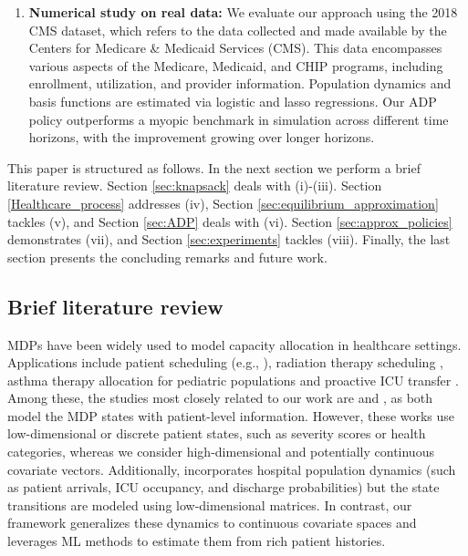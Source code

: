 \documentclass[12pt,a4paper]{article}
\begin{document}
\begin{enumerate}
        \item[(viii)]{ {\bf Numerical study on real data:} We evaluate our approach using the 2018 CMS dataset, which refers to the data collected and made available by the Centers for Medicare \& Medicaid Services (CMS). This data encompasses various aspects of the Medicare, Medicaid, and CHIP programs, including enrollment, utilization, and provider information. Population dynamics and basis functions are estimated via logistic and lasso regressions. Our ADP policy outperforms a myopic benchmark in simulation across different time horizons, with the improvement growing over longer horizons.}
	\end{enumerate}
	

	

	This paper is structured as follows. In the next section we perform a brief literature review. Section \ref{sec:knapsack} deals with (i)-(iii). Section \ref{Healthcare_process} addresses (iv), Section \ref{sec:equilibrium_approximation} tackles (v),  and Section \ref{sec:ADP} deals with (vi). Section \ref{sec:approx_policies} demonstrates (vii), and
    Section \ref{sec:experiments} tackles (viii). Finally, the last section presents the concluding remarks and future work. %

	\color{black}
	
	
	\subsection{Brief literature review}


    MDPs have been widely used to model capacity allocation in healthcare settings. Applications include patient scheduling (e.g., \cite{diamant, astaraky, saure2020}), radiation therapy scheduling \citep{saure2021},  asthma therapy allocation for pediatric populations \citep{deo} and proactive ICU transfer \citep{grandclement}. Among these, the studies most closely related to our work are \cite{deo} and \cite{grandclement}, as both model the MDP states with patient-level information. However, these works use low-dimensional or discrete patient states, such as severity scores or health categories, whereas we consider high-dimensional and potentially continuous covariate vectors. Additionally, \cite{grandclement} incorporates hospital population dynamics (such as patient arrivals, ICU occupancy, and discharge probabilities) but the state transitions are modeled using low-dimensional matrices. In contrast, our framework generalizes these dynamics to continuous covariate spaces and leverages ML methods to estimate them from rich patient histories.
    
\end{document}
